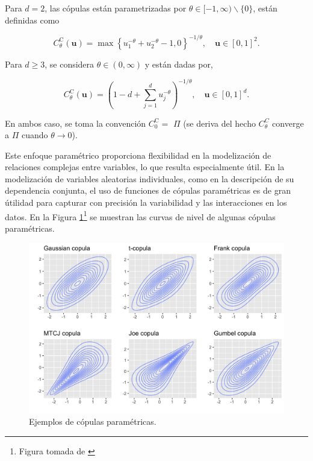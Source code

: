 \begin{ejemplo}
    Para $d=2$, las cópulas están parametrizadas por $\theta \in[-1, \infty) \backslash\{0\}$, están definidas como

    \begin{equation}
    C_\theta^{\mathrm{C}}(\boldsymbol{u})=\max \left\{u_1^{-\theta}+u_2^{-\theta}-1,0\right\}^{-1 / \theta}, \quad \boldsymbol{u} \in[0,1]^2.
\end{equation}

    Para $d \geq 3$, se considera $\theta \in(0, \infty)$ y están dadas por,

    \begin{equation}
    C_\theta^{\mathrm{C}}(\boldsymbol{u})=\left(1-d+\sum_{j=1}^d u_j^{-\theta}\right)^{-1 / \theta}, \quad \boldsymbol{u} \in[0,1]^d .
    \end{equation}

    En ambos caso, se toma la convención $C_0^{\mathrm{C}}=$ $\Pi$ (se deriva del hecho $C_\theta^C$ converge a $\Pi$ cuando $\theta \rightarrow 0$).
\end{ejemplo}


Este enfoque paramétrico proporciona flexibilidad en la modelización de relaciones complejas entre variables, lo que resulta especialmente útil. En la modelización de variables aleatorias individuales, como en la descripción de su dependencia conjunta, el uso de funciones de cópulas paramétricas es de gran útilidad para capturar con precisión la variabilidad y las interacciones en los datos. En la Figura \ref{fig:Parametric}\footnote{Figura tomada de \cite{ImgCopulas}} se muestran las curvas de nivel de algunas cópulas paramétricas.

\begin{figure}[H]
    \centering
    \includegraphics[width = 0.7 \textwidth]{Imagenes/parametricCopulas.png}
    \caption{Ejemplos de cópulas paramétricas.}
    \label{fig:Parametric}
\end{figure}


